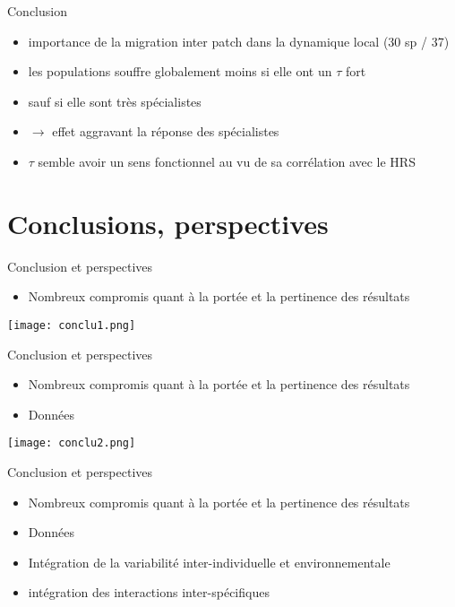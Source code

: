 \documentclass[]{beamer}
\begin{document}
\begin{frame}{Conclusion}
  \begin{itemize}[<+->]
  \item importance de la migration inter patch dans la dynamique local (30 sp / 37)
  \item les populations souffre globalement moins si elle ont un $\tau$ fort
  \item sauf si elle sont très spécialistes
  \item $\rightarrow$ effet aggravant la réponse des spécialistes
  \item $\tau$ semble avoir un sens fonctionnel au vu de sa corrélation avec le HRS
  \end{itemize}
\end{frame}





\section{Conclusions, perspectives}

\begin{frame}{Conclusion et perspectives}
  \begin{itemize}
  \item Nombreux compromis quant à la portée et la pertinence des résultats\\
  \end{itemize}
  \begin{center}
    \texttt{[image: conclu1.png]}
  \end{center}
\end{frame}

\begin{frame}{Conclusion et perspectives}
  \begin{itemize}
  \item Nombreux compromis quant à la portée et la pertinence des résultats\\
  \item Données
  \end{itemize}
  \begin{center}
    \texttt{[image: conclu2.png]}
  \end{center}

\end{frame}

\begin{frame}{Conclusion et perspectives}
  \begin{itemize}
  \item Nombreux compromis quant à la portée et la pertinence des résultats\\
  \item Données
  \item Intégration de la variabilité inter-individuelle et environnementale
  \item intégration des interactions inter-spécifiques
  \end{itemize}
\end{frame}
\end{document}
